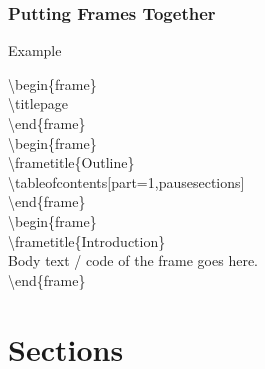\documentclass[aspectratio=169,utf8]{beamer}
\begin{document}
\begin{frame}
  \frametitle{Putting Frames Together}

  \begin{block}{Example}
    \tt \scriptsize

\textbackslash{}begin\{frame\}\\
\alert{\textbackslash{}titlepage}\\
\textbackslash{}end\{frame\}\\

\textbackslash{}begin\{frame\}\\
\alert{
\textbackslash{}frametitle\{Outline\}\\
\textbackslash{}tableofcontents[part=1,pausesections]
}\\
\textbackslash{}end\{frame\}\\

\textbackslash{}begin\{frame\}\\
\alert{\textbackslash{}frametitle\{Introduction\}}\\
Body text / code of the frame goes here.\\
\textbackslash{}end\{frame\}
    
  \end{block}
\end{frame}


\section{Sections}
\end{document}
